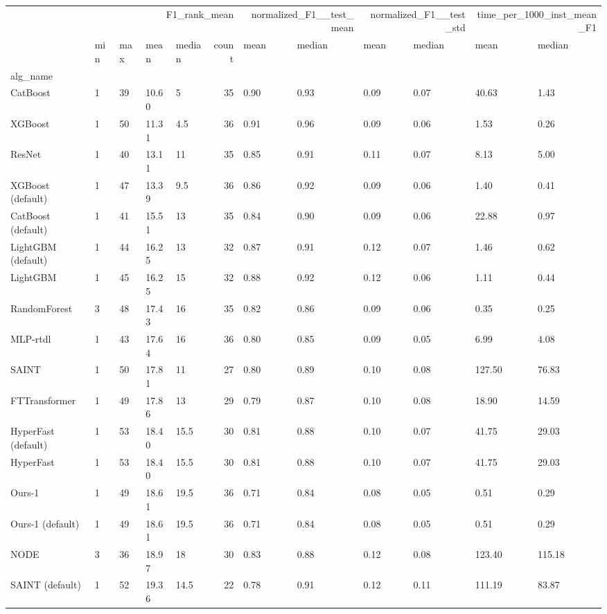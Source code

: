 \begin{tabular}{lllllrllllll}
\toprule
 & \multicolumn{5}{r}{F1_rank_mean} & \multicolumn{2}{r}{normalized_F1__test_mean} & \multicolumn{2}{r}{normalized_F1__test_std} & \multicolumn{2}{r}{time_per_1000_inst_mean_F1} \\
 & min & max & mean & median & count & mean & median & mean & median & mean & median \\
alg_name &  &  &  &  &  &  &  &  &  &  &  \\
\midrule
CatBoost & 1 & 39 & 10.60 & 5 & 35 & 0.90 & 0.93 & 0.09 & 0.07 & 40.63 & 1.43 \\
XGBoost & 1 & 50 & 11.31 & 4.5 & 36 & 0.91 & 0.96 & 0.09 & 0.06 & 1.53 & 0.26 \\
ResNet & 1 & 40 & 13.11 & 11 & 35 & 0.85 & 0.91 & 0.11 & 0.07 & 8.13 & 5.00 \\
XGBoost (default) & 1 & 47 & 13.39 & 9.5 & 36 & 0.86 & 0.92 & 0.09 & 0.06 & 1.40 & 0.41 \\
CatBoost (default) & 1 & 41 & 15.51 & 13 & 35 & 0.84 & 0.90 & 0.09 & 0.06 & 22.88 & 0.97 \\
LightGBM (default) & 1 & 44 & 16.25 & 13 & 32 & 0.87 & 0.91 & 0.12 & 0.07 & 1.46 & 0.62 \\
LightGBM & 1 & 45 & 16.25 & 15 & 32 & 0.88 & 0.92 & 0.12 & 0.06 & 1.11 & 0.44 \\
RandomForest & 3 & 48 & 17.43 & 16 & 35 & 0.82 & 0.86 & 0.09 & 0.06 & 0.35 & 0.25 \\
MLP-rtdl & 1 & 43 & 17.64 & 16 & 36 & 0.80 & 0.85 & 0.09 & 0.05 & 6.99 & 4.08 \\
SAINT & 1 & 50 & 17.81 & 11 & 27 & 0.80 & 0.89 & 0.10 & 0.08 & 127.50 & 76.83 \\
FTTransformer & 1 & 49 & 17.86 & 13 & 29 & 0.79 & 0.87 & 0.10 & 0.08 & 18.90 & 14.59 \\
HyperFast (default) & 1 & 53 & 18.40 & 15.5 & 30 & 0.81 & 0.88 & 0.10 & 0.07 & 41.75 & 29.03 \\
HyperFast & 1 & 53 & 18.40 & 15.5 & 30 & 0.81 & 0.88 & 0.10 & 0.07 & 41.75 & 29.03 \\
Ours-1 & 1 & 49 & 18.61 & 19.5 & 36 & 0.71 & 0.84 & 0.08 & 0.05 & 0.51 & 0.29 \\
Ours-1 (default) & 1 & 49 & 18.61 & 19.5 & 36 & 0.71 & 0.84 & 0.08 & 0.05 & 0.51 & 0.29 \\
NODE & 3 & 36 & 18.97 & 18 & 30 & 0.83 & 0.88 & 0.12 & 0.08 & 123.40 & 115.18 \\
SAINT (default) & 1 & 52 & 19.36 & 14.5 & 22 & 0.78 & 0.91 & 0.12 & 0.11 & 111.19 & 83.87 \\

\end{tabular}
